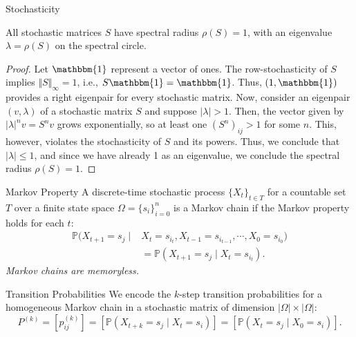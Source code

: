 \documentclass{beamer}
\newcommand{\iter}[2]{#1^{(#2)}}
\newcommand{\iter}[2]{#1^{(#2)}}
\newcommand{\prob}{\mathbb{P}}
\begin{document}
\begin{frame}{Stochasticity}
	\begin{theorem}
	    All stochastic matrices $S$ have spectral radius $\rho(S)=1$, with an eigenvalue $\lambda = \rho(S)$ on the spectral circle.
	\end{theorem}
	\begin{proof}
	    Let $\mathbbm{1}$ represent a vector of ones. The row-stochasticity of $S$ implies $\Vert S \Vert_{\infty} = 1$, i.e., $S \mathbbm{1} = \mathbbm{1}$. Thus, $(1, \mathbbm{1})$ provides a right eigenpair for every stochastic matrix. Now, consider an eigenpair $(v, \lambda)$ of a stochastic matrix $S$ and suppose $|\lambda| > 1$. Then, the vector given by $|\lambda|^n v = S^n v$ grows exponentially, so at least one $(S^n)_{ij} > 1$ for some $n$. This, however, violates the stochasticity of $S$ and its powers. Thus, we conclude that $|\lambda| \leq 1$, and since we have already 1 as an eigenvalue, we conclude the spectral radius $\rho(S)=1$.
	\end{proof}
	
\end{frame}

\begin{frame}{Markov Property}
    A discrete-time stochastic process $\{X_t\}_{t \in T}$ for a countable set $T$ over a finite state space $\Omega = \{s_i\}_{i=0}^{n}$ is a Markov chain if the Markov property holds for each $t$:
	\begin{align*}
		\prob(X_{t+1} = s_j \mid &X_t = s_{i_t}, X_{t-1} = s_{i_{t-1}},\cdots, X_0 = s_{i_0}) \\ &= \prob(X_{t+1} = s_j \mid X_t=s_{i_{t}}).
	\end{align*}
	\vspace{2mm}
	\pause \centering \textit{Markov chains are memoryless.}
\end{frame}

\begin{frame}{Transition Probabilities}
    We encode the $k$-step transition probabilities for a homogeneous Markov chain in a stochastic matrix of dimension $|\Omega| \times |\Omega|$:
	\begin{equation*}
		\iter{P}{k} = [ \iter{p}{k}_{ij} ] = [ \prob(X_{t+k} = s_j \mid X_t = s_i) ] = [ \prob(X_{t} = s_j \mid X_0 = s_i) ].
	\end{equation*}
\end{frame}
\end{document}
